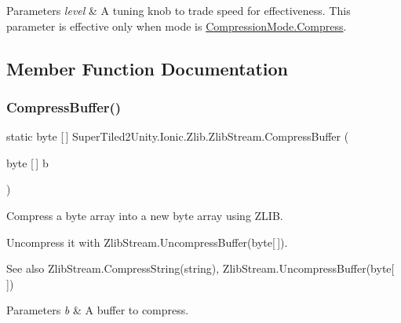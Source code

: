 \begin{DoxyParams}{Parameters}
{\em level} & A tuning knob to trade speed for effectiveness. This parameter is effective only when mode is {\ttfamily \mbox{\hyperlink{namespace_super_tiled2_unity_1_1_ionic_1_1_zlib_ad5b7635d92497e1c905e5de82eb1c6b1a8fa4fcfcda70410e089984d5f51ae97d}{Compression\+Mode.\+Compress}}}. \\
\hline
\end{DoxyParams}


\subsection{Member Function Documentation}
\mbox{\label{class_super_tiled2_unity_1_1_ionic_1_1_zlib_1_1_zlib_stream_aa7d8b91ad22da385b13a4b384ace934b}} 
\subsubsection{\texorpdfstring{Compress\+Buffer()}{CompressBuffer()}}
{\footnotesize\ttfamily static byte \mbox{[}$\,$\mbox{]} Super\+Tiled2\+Unity.\+Ionic.\+Zlib.\+Zlib\+Stream.\+Compress\+Buffer (\begin{DoxyParamCaption}\item[{byte \mbox{[}$\,$\mbox{]}}]{b }\end{DoxyParamCaption})\hspace{0.3cm}{\ttfamily [static]}}



Compress a byte array into a new byte array using Z\+L\+IB. 

Uncompress it with Zlib\+Stream.\+Uncompress\+Buffer(byte\mbox{[}$\,$\mbox{]}). 

\begin{DoxySeeAlso}{See also}
Zlib\+Stream.\+Compress\+String(string), Zlib\+Stream.\+Uncompress\+Buffer(byte\mbox{[}$\,$\mbox{]})


\end{DoxySeeAlso}



\begin{DoxyParams}{Parameters}
{\em b} & A buffer to compress. \\
\hline
\end{DoxyParams}


